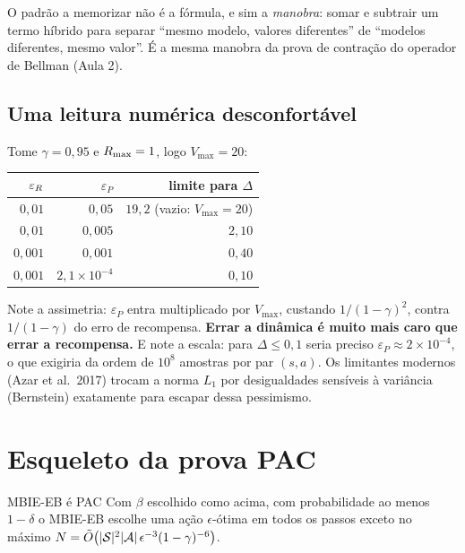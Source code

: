 \documentclass[11pt, a4paper]{article}
\newcommand{\Vmax}{V_{\max}}
\begin{document}
\begin{ideiabox}
O padrão a memorizar não é a fórmula, e sim a \emph{manobra}: somar e subtrair um termo
híbrido para separar ``mesmo modelo, valores diferentes'' de ``modelos diferentes, mesmo
valor''. É a mesma manobra da prova de contração do operador de Bellman (Aula 2).
\end{ideiabox}

\subsection{Uma leitura numérica desconfortável}

Tome $\gamma = 0{,}95$ e $R_{\max} = 1$, logo $\Vmax = 20$:

\begin{center}\small
\begin{tabular}{@{}rrr@{}}
\toprule
$\varepsilon_{R}$ & $\varepsilon_P$ & limite para $\Delta$ \\
\midrule
$0{,}01$  & $0{,}05$    & $19{,}2$ \quad (vazio: $\Vmax = 20$) \\
$0{,}01$  & $0{,}005$   & $2{,}10$ \\
$0{,}001$ & $0{,}001$   & $0{,}40$ \\
$0{,}001$ & $2{,}1\times 10^{-4}$ & $0{,}10$ \\
\bottomrule
\end{tabular}
\end{center}

\begin{alertabox}
Note a assimetria: $\varepsilon_P$ entra multiplicado por $\Vmax$, custando
$1/(1-\gamma)^2$, contra $1/(1-\gamma)$ do erro de recompensa. \textbf{Errar a dinâmica é
muito mais caro que errar a recompensa.} E note a escala: para $\Delta \le 0{,}1$ seria
preciso $\varepsilon_P \approx 2\times 10^{-4}$, o que exigiria da ordem de $10^{8}$
amostras por par $(s,a)$. Os limitantes modernos (Azar et al.\ 2017) trocam a norma $L_1$
por desigualdades sensíveis à variância (Bernstein) exatamente para escapar dessa
pessimismo.
\end{alertabox}

\section{Esqueleto da prova PAC}

\begin{teobox}{MBIE-EB é PAC}
Com $\beta$ escolhido como acima, com probabilidade ao menos $1-\delta$ o MBIE-EB escolhe
uma ação $\epsilon$-ótima em todos os passos exceto no máximo
$N = \tilde{O}\bigl(\lvert\mathcal{S}\rvert^{2}\lvert\mathcal{A}\rvert\,\epsilon^{-3}(1-\gamma)^{-6}\bigr)$.
\end{teobox}
\end{document}
